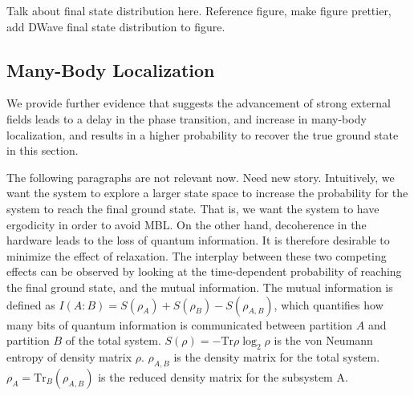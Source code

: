 \documentclass[prd,twocolumn,tightenlines,preprintnumbers,showpacs,superscriptaddress,notitlepage,nofootinbib,eqsecnum,floatfix,longbibliography]{revtex4}
\begin{document}
{\color{red} Talk about final state distribution here. Reference figure, make figure prettier, add DWave final state distribution to figure.}

\subsection{Many-Body Localization}

We provide further evidence that suggests the advancement of strong external fields leads to a delay in the phase transition, and increase in many-body localization, and results in a higher probability to recover the true ground state in this section.

{\color{red} The following paragraphs are not relevant now. Need new story.}
Intuitively, we want the system to explore a larger state space to increase the probability for the system to reach the final ground state. That is, we want the system to have ergodicity in order to avoid MBL. On the other hand, decoherence in the hardware leads to the loss of quantum information. It is therefore desirable to minimize the effect of relaxation. The interplay between these two competing effects can be observed by looking at the time-dependent probability of reaching the final ground state, and the mutual information. The mutual information is defined as $I(A:B)=S(\rho_A)+S(\rho_B)-S(\rho_{A,B})$, which quantifies how many bits of quantum information is communicated between partition $A$ and partition $B$ of the total system. $S(\rho)=-\mbox{Tr}\rho \log_2 \rho$ is the von Neumann entropy of density matrix $\rho$. {\color{blue} $\rho_{A,B}$ is the density matrix for the total system. $\rho_{A}=\mbox{Tr}_{B} (\rho_{A,B})$ is the reduced density matrix for the subsystem A.}
\end{document}
